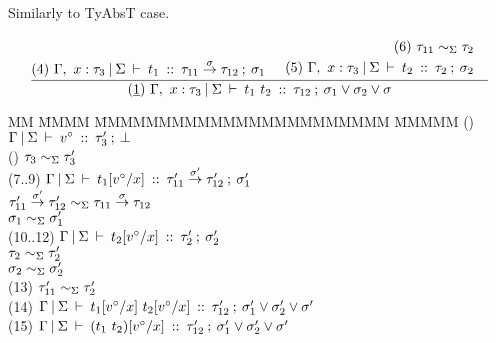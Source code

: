 \begin{flushleft}
Similarly to TyAbsT case.
\bigskip


$$
	\frac
	{ \begin{aligned}
	  \\
	  (4) \ 
	  \tyJudge
		{\Gamma, \ x : \tau_3}
		{\Sigma}
		{t_1}
		{\tau_{11} \funa{\sigma} \tau_{12}}
		{\sigma_1}
	  \end{aligned}
	  \tspace
	  \begin{aligned}
	  (6) \
   	  \tau_{11} \sims \tau_2
	  \\
	  (5) \ 
	  \tyJudge
	  	{\Gamma, \ x : \tau_3} 
	  	{\Sigma}
		{t_2}
		{\tau_2}
		{\sigma_2}
	  &
	  \end{aligned}
	}
	{ (\un{1}) \ \tyJudge 
			{\Gamma, \ x : \tau_3}
			{\Sigma} {t_1 \ t_2} {\tau_{12}}
			{\sigma_1 \lor \sigma_2 \lor \sigma} 
	}
$$	
\begin{tabbing}
MM \= MMMM \= MMMMMMMMMMMMMMMMMMMMMMM \= MMMMM  \kill
\>	() 	\> $\Gamma \: \arrowvert \: \Sigma \: \vdash \: v^\circ \: :: \: \tau_3' \: ; \: \bot$
			\> 
\\[1ex]
\>	(\un{3}) 	\> $\tau_3 \sim_\Sigma \tau_3'$
			\> 
\\[1ex]
\>	(7..9) 		\> $\Gamma \: \arrowvert \: \Sigma \: \vdash \: t_1[v^\circ/x] \: :: \: \tau_{11}' \stackrel{\sigma'}{\rightarrow} \tau_{12}' \: ; \: \sigma_1'$
\\[0.2ex]
\>			\> \qq	${\tau_{11}' \stackrel{\sigma'}{\rightarrow} \tau_{12}'}
				\sim_\Sigma
				{\tau_{11} \stackrel{\sigma}{\rightarrow} \tau_{12}}$
\\[0.2ex]
\>			\> \qq	$\sigma_1 \sim_\Sigma \sigma_1'$
			\> \pby{IH 4 2 3}
\\[1ex]
\>	(10..12) 	\> $\Gamma \: \arrowvert \: \Sigma \: \vdash \: t_2[v^\circ/x] \: :: \: \tau_2' \: ; \: \sigma_2'$
\\[0.2ex]
\>			\> \qq	$\tau_2 \sim_\Sigma \tau_2'$
\\[0.2ex]
\>			\> \qq	$\sigma_2 \sim_\Sigma \sigma_2'$
			\> \pby{IH 5 2 3}
\\[1ex]
\>	(13)		\> $\tau_{11}' \sim_\Sigma \tau_2'$
			\>  
\\[1ex]
\>	(14) 		\> $\Gamma \: \arrowvert \: \Sigma \: \vdash \: t_1[v^\circ/x] \ t_2[v^\circ/x] \: :: \: \tau_{12}' \: ; \:  \sigma_1' \lor \sigma_2' \lor \sigma' $
			\> 
\\[1ex]
\>	(15) 		\> $\Gamma \: \arrowvert \: \Sigma \: \vdash \: (t_1 \ t_2)[v^\circ/x] \: :: \: \tau_{12}' \: ; \:  \sigma_1' \lor \sigma_2' \lor \sigma' $
			\> 
\end{tabbing}
\bigskip


 \\
 \\


\end{flushleft}
